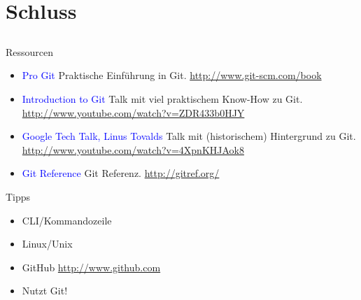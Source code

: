 \section{Schluss}
\subsection{}

\begin{frame}{Ressourcen}
    \begin{itemize}[<+->]
        \item \textcolor{blue}{Pro Git} Praktische Einführung in Git. \url{http://www.git-scm.com/book}
        \item \textcolor{blue}{Introduction to Git} Talk mit viel praktischem Know-How zu Git. \url{http://www.youtube.com/watch?v=ZDR433b0HJY}
        \item \textcolor{blue}{Google Tech Talk, Linus Tovalds} Talk mit (historischem) Hintergrund zu Git. \url{http://www.youtube.com/watch?v=4XpnKHJAok8}
        \item \textcolor{blue}{Git Reference} Git Referenz. \url{http://gitref.org/}
    \end{itemize}
\end{frame}

\begin{frame}{Tipps}
    \begin{itemize}[<+->]
        \item CLI/Kommandozeile
        \item Linux/Unix
        \item GitHub \url{http://www.github.com}
        \item Nutzt Git!
    \end{itemize}
\end{frame}


